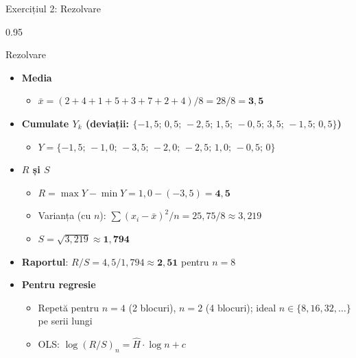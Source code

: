 \documentclass[9pt, aspectratio=169, t]{beamer}
\begin{document}
\begin{frame}[shrink=15]{Exercițiul 2: Rezolvare}
\begin{cminipage}{0.95\textwidth}
\begin{exampleblock}{Rezolvare}
\begin{itemize}\setlength{\itemsep}{0pt}
    \item \textbf{Media}
    \begin{itemize}\setlength{\itemsep}{0pt}
        \item $\bar x=(2+4+1+5+3+7+2+4)/8=28/8=\mathbf{3{,}5}$
    \end{itemize}
    \item \textbf{Cumulate $Y_k$ (deviații: $\{-1{,}5;\,0{,}5;\,-2{,}5;\,1{,}5;\,-0{,}5;\,3{,}5;\,-1{,}5;\,0{,}5\}$)}
    \begin{itemize}\setlength{\itemsep}{0pt}
        \item $Y=\{-1{,}5;\,-1{,}0;\,-3{,}5;\,-2{,}0;\,-2{,}5;\,1{,}0;\,-0{,}5;\,0\}$
    \end{itemize}
    \item \textbf{$R$ și $S$}
    \begin{itemize}\setlength{\itemsep}{0pt}
        \item $R=\max Y-\min Y=1{,}0-(-3{,}5)=\mathbf{4{,}5}$
        \item Varianța (cu $n$): $\sum(x_i-\bar x)^2/n=25{,}75/8\approx 3{,}219$
        \item $S=\sqrt{3{,}219}\approx \mathbf{1{,}794}$
    \end{itemize}
    \item \textbf{Raportul}: $R/S=4{,}5/1{,}794\approx \mathbf{2{,}51}$ pentru $n=8$
    \item \textbf{Pentru regresie}
    \begin{itemize}\setlength{\itemsep}{0pt}
        \item Repetă pentru $n=4$ (2 blocuri), $n=2$ (4 blocuri); ideal $n\in\{8,16,32,\ldots\}$ pe serii lungi
        \item OLS: $\log(R/S)_n=\hat H\cdot\log n+c$
    \end{itemize}
\end{itemize}
\end{exampleblock}
\end{cminipage}
\end{frame}
\end{document}
